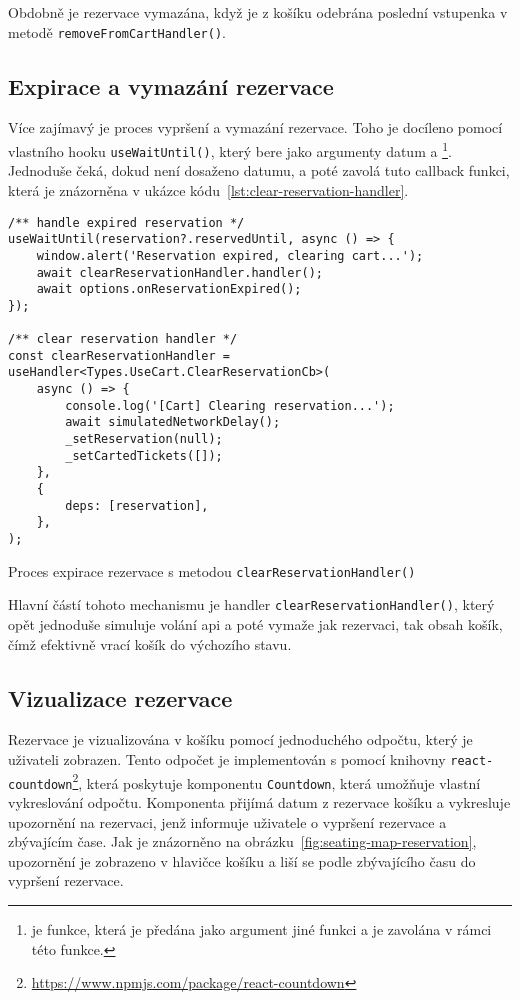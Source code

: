 Obdobně je rezervace vymazána, když je z košíku odebrána poslední vstupenka v metodě \texttt{removeFromCartHandler()}.

\subsection{Expirace a vymazání rezervace}
\label{subsec:implementace-rezervace-expirace}
Více zajímavý je proces vypršení a vymazání rezervace.
Toho je docíleno pomocí vlastního hooku \texttt{useWaitUntil()}, který bere jako argumenty datum a \footnote{ je funkce, která je předána jako argument jiné funkci a je zavolána v rámci této funkce.}.
Jednoduše čeká, dokud není dosaženo datumu, a poté zavolá tuto callback funkci, která je znázorněna v ukázce kódu~\ref{lst:clear-reservation-handler}.

\begin{listing}[H]
\begin{verbatim}
/** handle expired reservation */
useWaitUntil(reservation?.reservedUntil, async () => {
	window.alert('Reservation expired, clearing cart...');
	await clearReservationHandler.handler();
	await options.onReservationExpired();
});

/** clear reservation handler */
const clearReservationHandler = useHandler<Types.UseCart.ClearReservationCb>(
	async () => {
		console.log('[Cart] Clearing reservation...');
		await simulatedNetworkDelay();
		_setReservation(null);
		_setCartedTickets([]);
	},
	{
		deps: [reservation],
	},
);
\end{verbatim}
\caption{Proces expirace rezervace s metodou \texttt{clearReservationHandler()}}
\label{lst:clear-reservation-handler}
\end{listing}

Hlavní částí tohoto mechanismu je handler \texttt{clearReservationHandler()}, který opět jednoduše simuluje volání \ac{api} a poté vymaže jak rezervaci, tak obsah košík, čímž efektivně vrací košík do výchozího stavu.

\subsection{Vizualizace rezervace}
\label{subsec:implementace-rezervace-vizualizace}
Rezervace je vizualizována v košíku pomocí jednoduchého odpočtu, který je uživateli zobrazen.
Tento odpočet je implementován s pomocí knihovny \texttt{react-countdown}\footnote{\url{https://www.npmjs.com/package/react-countdown}}, která poskytuje komponentu \texttt{Countdown}, která umožňuje vlastní vykreslování odpočtu.
Komponenta přijímá datum z rezervace košíku a vykresluje upozornění na rezervaci, jenž informuje uživatele o vypršení rezervace a zbývajícím čase.
Jak je znázorněno na obrázku~\ref{fig:seating-map-reservation}, upozornění je zobrazeno v hlavičce košíku a liší se podle zbývajícího času do vypršení rezervace.

